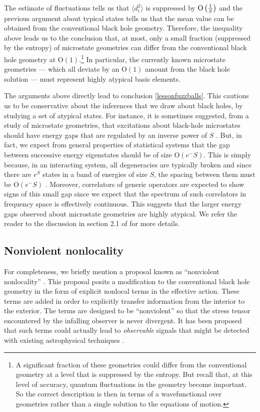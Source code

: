 \documentclass[12pt]{article}
\def\Or[#1]{{\text{O}}\left({#1}\right)}
\begin{document}
The estimate of fluctuations tells us  that $\langle d_i^2 \rangle$ is suppressed by $\Or[{1 \over S}]$ and the previous argument about typical states tells us that the mean value can be obtained from the conventional black hole geometry. Therefore, the inequality above leads us to the conclusion that, at most,  only a small fraction (suppressed by the entropy) of microstate geometries can differ from the conventional black hole geometry at $\Or[1]$.\footnote{A significant fraction of these geometries could differ from the conventional geometry at a level that is suppressed by the entropy. But recall that, at this level of accuracy,   quantum fluctuations in the geometry become important. So the correct description is then in terms of a wavefunctional over geometries rather than a single solution to the equations of motion.} 
In particular, the currently known  microstate geometries --- which all deviate by an $\Or[1]$ amount from the black hole solution --- must represent highly atypical basis elements.

The arguments above directly lead to conclusion \ref{lessonfuzzballs}. This cautions us to be conservative about the inferences that we draw about black holes, by studying a set of atypical states. For instance, it is sometimes suggested, from a study of microstate geometries, that  excitations about black-hole microstates should have energy gaps that are regulated by an inverse power of $S$ \cite{Tyukov:2017uig}.  But, in fact, we expect from general properties of statistical systems that the gap between successive energy eigenstates should be of size $\Or[e^{-S}]$.  
This is simply because, in an interacting system, all degeneracies are typically broken and since there are $e^{S}$ states in a band of energies of size $S$, the spacing between them must be $\Or[e^{-S}]$ \cite{casati1985energy,berry1977level}. Moreover, correlators of generic operators are expected to show signs of this small gap since we expect that the spectrum of such correlators in frequency space is effectively continuous.  This suggests that the larger energy gaps observed about microstate geometries are highly atypical.
We refer the reader to the discussion in section 2.1 of \cite{Raju:2018xue} for more details. 





\subsection{Nonviolent nonlocality}
For completeness, we briefly mention a proposal known as ``nonviolent nonlocality'' \cite{Giddings:2012gc}. This proposal posits a modification to the conventional black hole geometry in the form of explicit nonlocal terms in the effective action. These terms are added in order to explicitly transfer information from the interior to the exterior. The terms are designed to be ``nonviolent'' so that the stress tensor encountered by the infalling observer is never divergent. It has been proposed that such terms could actually lead to {\em observable} signals that might be detected  with existing astrophysical techniques \cite{Giddings:2019jwy}. 
\end{document}
